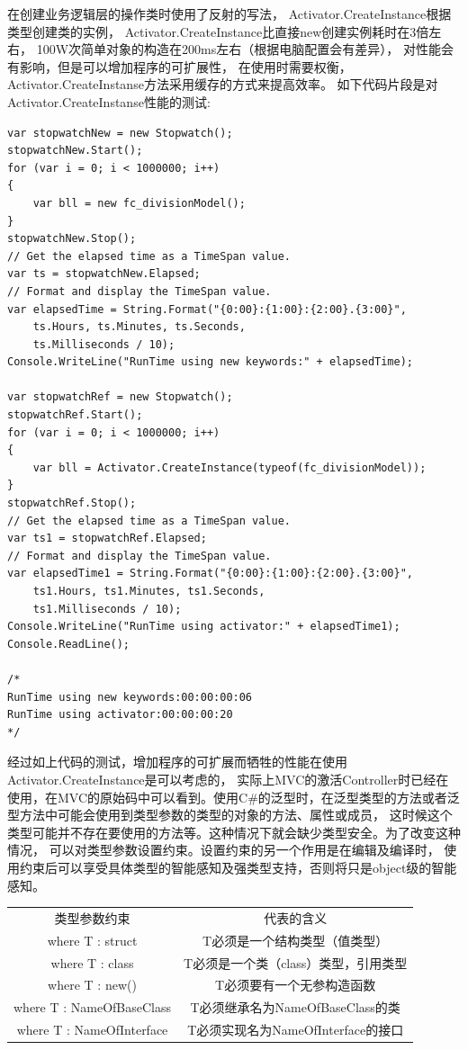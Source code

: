 \documentclass{book}
\begin{document}
在创建业务逻辑层的操作类时使用了反射的写法，
Activator.CreateInstance根据类型创建类的实例，
Activator.CreateInstance比直接new创建实例耗时在3倍左右，
100W次简单对象的构造在200ms左右（根据电脑配置会有差异），
对性能会有影响，但是可以增加程序的可扩展性，
在使用时需要权衡，Activator.CreateInstanse方法采用缓存的方式来提高效率。
如下代码片段是对Activator.CreateInstanse性能的测试:

\begin{lstlisting}[language={[Sharp]C}]
var stopwatchNew = new Stopwatch();
stopwatchNew.Start();
for (var i = 0; i < 1000000; i++)
{
    var bll = new fc_divisionModel();
}
stopwatchNew.Stop();
// Get the elapsed time as a TimeSpan value.
var ts = stopwatchNew.Elapsed;
// Format and display the TimeSpan value.
var elapsedTime = String.Format("{0:00}:{1:00}:{2:00}.{3:00}",
    ts.Hours, ts.Minutes, ts.Seconds,
    ts.Milliseconds / 10);
Console.WriteLine("RunTime using new keywords:" + elapsedTime);

var stopwatchRef = new Stopwatch();
stopwatchRef.Start();
for (var i = 0; i < 1000000; i++)
{
    var bll = Activator.CreateInstance(typeof(fc_divisionModel));
}
stopwatchRef.Stop();
// Get the elapsed time as a TimeSpan value.
var ts1 = stopwatchRef.Elapsed;
// Format and display the TimeSpan value.
var elapsedTime1 = String.Format("{0:00}:{1:00}:{2:00}.{3:00}",
    ts1.Hours, ts1.Minutes, ts1.Seconds,
    ts1.Milliseconds / 10);
Console.WriteLine("RunTime using activator:" + elapsedTime1);
Console.ReadLine();

/*
RunTime using new keywords:00:00:00:06
RunTime using activator:00:00:00:20
*/
\end{lstlisting}

经过如上代码的测试，增加程序的可扩展而牺牲的性能在使用Activator.CreateInstance是可以考虑的，
实际上MVC的激活Controller时已经在使用，在MVC的原始码中可以看到。使用C\#的泛型时，在泛型类型的方法或者泛型方法中可能会使用到类型参数的类型的对象的方法、属性或成员，
这时候这个类型可能并不存在要使用的方法等。这种情况下就会缺少类型安全。为了改变这种情况，
可以对类型参数设置约束。设置约束的另一个作用是在编辑及编译时，
使用约束后可以享受具体类型的智能感知及强类型支持，否则将只是object级的智能感知。

\begin{tabular}{|c|c|}
	\hline
	\multirow{1}{*}{类型参数约束}
	& \multicolumn{1}{c|}{代表的含义}\\ 		
	\cline{1-2}
	where T : struct & T必须是一个结构类型（值类型）\\
	\hline
	where T : class & T必须是一个类（class）类型，引用类型\\
	\hline
	where T : new() & T必须要有一个无参构造函数\\
	\hline
	where T : NameOfBaseClass & T必须继承名为NameOfBaseClass的类\\
	\hline
	where T : NameOfInterface & T必须实现名为NameOfInterface的接口\\
	\hline	
\end{tabular}
\end{document}
